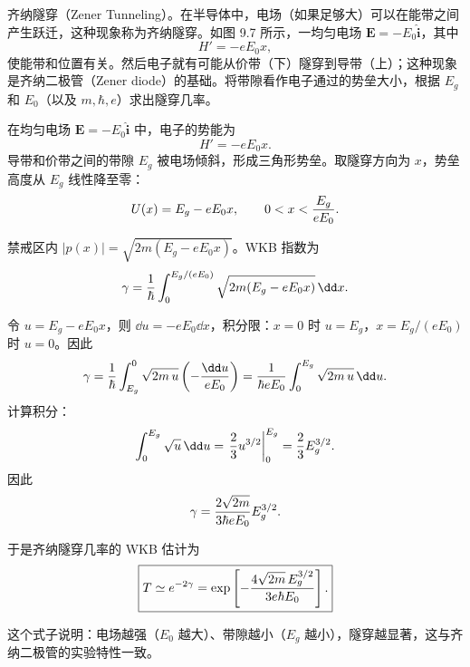\begin{question}
齐纳隧穿（Zener Tunneling）。在半导体中，电场（如果足够大）可以在能带之间产生跃迁，这种现象称为齐纳隧穿。如图 9.7 所示，一均匀电场 $\mathbf E=-E_0\hat{\mathbf i}$，其中
\[
H'=-eE_0x,
\]
使能带和位置有关。然后电子就有可能从价带（下）隧穿到导带（上）；这种现象是齐纳二极管（Zener diode）的基础。将带隙看作电子通过的势垒大小，根据 $E_g$ 和 $E_0$（以及 $m,\hbar,e$）求出隧穿几率。
\end{question}
\begin{solution}
在均匀电场 $\mathbf E=-E_0\hat{\mathbf i}$ 中，电子的势能为
\[
H'=-eE_0x.
\]
导带和价带之间的带隙 $E_g$ 被电场倾斜，形成三角形势垒。取隧穿方向为 $x$，势垒高度从 $E_g$ 线性降至零：
\[
U(x)=E_g-eE_0x,
\qquad 0<x<{E_g\over eE_0}.
\]

禁戒区内 $|p(x)|=\sqrt{2m(E_g-eE_0x)}$。WKB 指数为
\[
\gamma={1\over\hbar}\int_0^{E_g/(eE_0)}
\sqrt{2m(E_g-eE_0x)}\,\dd x.
\]

令 $u=E_g-eE_0x$，则 $\dd u=-eE_0\dd x$，积分限：$x=0$ 时 $u=E_g$，$x=E_g/(eE_0)$ 时 $u=0$。因此
\[
\gamma={1\over\hbar}\int_{E_g}^{0}\sqrt{2m\,u}\left(-{\dd u\over eE_0}\right)
={1\over\hbar eE_0}\int_0^{E_g}\sqrt{2m\,u}\,\dd u.
\]
计算积分：
\[
\int_0^{E_g}\sqrt{u}\,\dd u
=\left.{2\over3}u^{3/2}\right|_0^{E_g}={2\over3}E_g^{3/2}.
\]
因此
\[
\gamma={2\sqrt{2m}\over3\hbar eE_0}E_g^{3/2}.
\]

于是齐纳隧穿几率的 WKB 估计为
\[
\boxed{T\simeq e^{-2\gamma}
=\exp\left[-{4\sqrt{2m}\,E_g^{3/2}\over3e\hbar E_0}\right].}
\]

这个式子说明：电场越强（$E_0$ 越大）、带隙越小（$E_g$ 越小），隧穿越显著，这与齐纳二极管的实验特性一致。
\end{solution}

